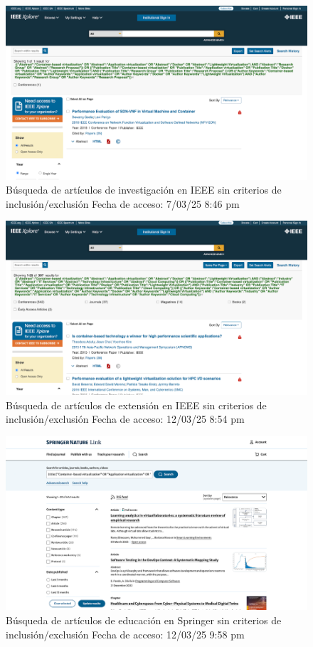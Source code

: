 \FloatBarrier\begin{figure}[htbp]
    \centering
    \includegraphics[width=\textwidth,keepaspectratio]{apendices/BD/sin-criterios/IEEE-inv.png}
    \caption{Búsqueda de artículos de investigación en IEEE sin criterios de inclusión/exclusión
    Fecha de acceso: 7/03/25 8:46 pm
    }\label{fig:busqueda5}
\end{figure}
\FloatBarrier\begin{figure}[htbp]
    \centering
    \includegraphics[width=\textwidth,keepaspectratio]{apendices/BD/sin-criterios/IEEE-ind.png}
    \caption{Búsqueda de artículos de extensión en IEEE sin criterios de inclusión/exclusión
    Fecha de acceso: 12/03/25 8:54 pm
    }\label{fig:busqueda6}
\end{figure}
\FloatBarrier\begin{figure}[htbp]
    \centering
    \includegraphics[width=\textwidth,keepaspectratio]{apendices/BD/sin-criterios/Springer-ed.png}
    \caption{Búsqueda de artículos de educación en Springer sin criterios de inclusión/exclusión
    Fecha de acceso: 12/03/25 9:58 pm
    }\label{fig:busqueda7}
\end{figure}
